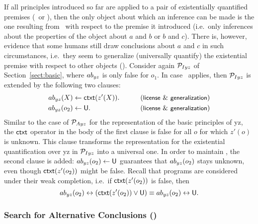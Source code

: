 \documentclass[12pt]{article}
\begin{document}
If all principles introduced so far are applied to a pair of existentially quantified premises
(\MI\ or \MO), then the only object about which an inference can be made is the one
resulting from \ with respect to the premise it introduced (i.e.\ only inferences about the properties 
of the object about $a$ and $b$ or
$b$ and $c$). 
There is, however, evidence that some humans still draw conclusions about $a$ and $c$ in such
circumstances, i.e.\ they seem to generalize (universally quantify) the existential 
premise with respect to other objects (\negFailure).
Consider again ${\cal P}_{I yz}$ of Section~\ref{sect:basic}, where $ab_{yz}$ is only false for 
$o_1$. In case \negFailure\ applies, then
${\cal P}_{I yz}$ is extended by the following two clauses:
\begin{align}
\Ab_{yz}(X) & \leftarrow \cxt(z'(X)). & \tag{\licenses\ \&\ \negFailure} \\
\Ab_{yz}(o_2) & \leftarrow \udf. & \tag{\licenses\ \&\ \negFailure} 
\end{align}
Similar to the case of ${\cal P}_{Ayz}$ for the representation of the basic principles of \MA yz,
the $\mathsf{ctxt}$ operator in the body of the first clause is false for all $o$
for which $z'(o)$ is unknown. This clause transforms the representation for the existential quantification over \MI yz in ${\cal P}_{Iyz}$
into a universal one. In order to maintain \unknownGen, the second clause is added:
$ab_{yz}(o_2) \leftarrow \mathsf{U}$ guarantees that $ab_{yz}(o_2)$ stays unknown, even though $\mathsf{ctxt}(z'(o_2))$ might be false.
Recall that programs are considered under their weak completion, i.e.\ if $\mathsf{ctxt}(z'(o_2))$ is false, then
\[ab_{yz}(o_2) \leftrightarrow (\mathsf{ctxt}(z'(o_2)) \vee \mathsf{U})
 \equiv ab_{yz}(o_2) \leftrightarrow \mathsf{U}.\]




\subsubsection{Search for Alternative Conclusions (\abduction)}
\end{document}
